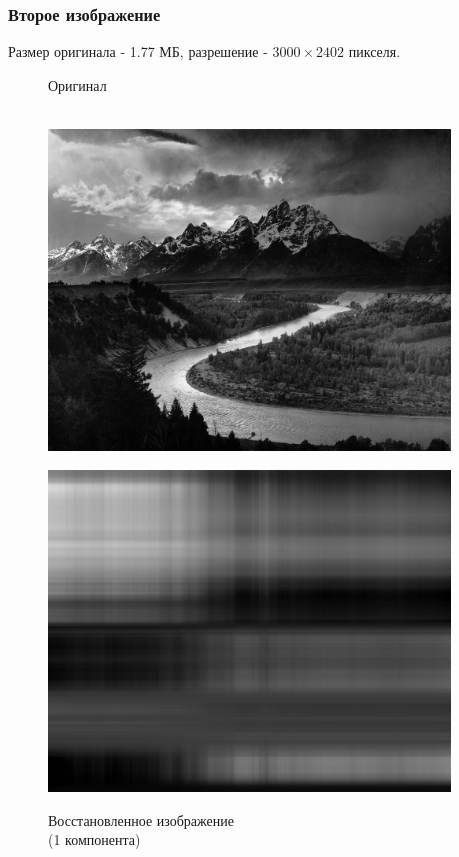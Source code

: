 \documentclass[a4paper]{article}
\begin{document}
\subsubsection{Второе изображение}
Размер оригинала - 1.77 МБ, разрешение - $3000\times 2402$ пикселя.
\begin{figure}[H]
\centering
    \begin{minipage}{.5\textwidth}
    \centering
    \caption{Оригинал\\$\,$}
    \includegraphics[width = 0.95\textwidth]{resources/Adams_The_Tetons_and_the_Snake_River.jpg}
    \label{fig:mount}
    \end{minipage}%
    \begin{minipage}{.5\textwidth}
      \centering
    \caption{Восстановленное изображение \\(1 компонента)}
    \includegraphics[width = 0.95\textwidth]{reconstructions/with_1comps_Adams_The_Tetons_and_the_Snake_River.jpg}
    \label{fig:mount_1}
    \end{minipage}%
\end{figure}
\end{document}

